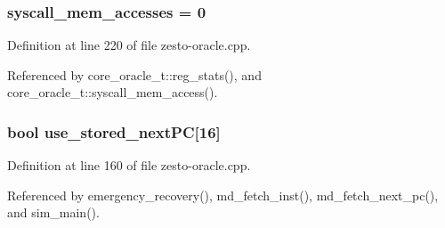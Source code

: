 \subsubsection[{syscall\_\-mem\_\-accesses}]{ {\bf syscall\_\-mem\_\-accesses} = 0\hspace{0.3cm}{\tt  [static]}}\label{zesto-oracle_8cpp_4f7a5d6cac7682f923ed4e3a7234921f}




Definition at line 220 of file zesto-oracle.cpp.

Referenced by core\_\-oracle\_\-t::reg\_\-stats(), and core\_\-oracle\_\-t::syscall\_\-mem\_\-access().
\subsubsection[{use\_\-stored\_\-nextPC}]{\setlength{\rightskip}{0pt plus 5cm}bool {\bf use\_\-stored\_\-nextPC}[16]}\label{zesto-oracle_8cpp_38a36f4cd3940833135cd0c497f726f4}




Definition at line 160 of file zesto-oracle.cpp.

Referenced by emergency\_\-recovery(), md\_\-fetch\_\-inst(), md\_\-fetch\_\-next\_\-pc(), and sim\_\-main().